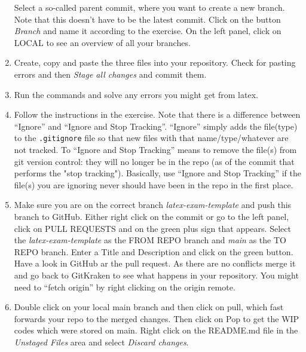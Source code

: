 \begin{enumerate}
Select a so-called parent commit, where you want to create a new branch.
Note that this doesn't have to be the latest commit.
Click on the button \emph{Branch} and name it according to the exercise.
On the left panel, click on LOCAL to see an overview of all your branches.
\item Create, copy and paste the three files into your repository.
Check for pasting errors and then \emph{Stage all changes} and commit them.
\item Run the commands and solve any errors you might get from latex.
\item Follow the instructions in the exercise.
Note that there is a difference between \enquote{Ignore} and \enquote{Ignore and Stop Tracking}.
\enquote{Ignore} simply adds the file(type) to the \texttt{.gitignore} file so that new files with that name/type/whatever are not tracked.
To \enquote{Ignore and Stop Tracking} means to remove the file(s) from git version control:
  they will no longer be in the repo (as of the commit that performs the "stop tracking").
Basically, use \enquote{Ignore and Stop Tracking} if the file(s) you are ignoring never should have been in the repo in the first place.
\item Make sure you are on the correct branch \emph{latex-exam-template}
  and push this branch to GitHub.
Either right click on the commit or go to the left panel, click on PULL REQUESTS and on the green plus sign that appears.
Select the \emph{latex-exam-template} as the FROM REPO branch and \emph{main} as the TO REPO branch.
Enter a Title and Description and click on the green button.
Have a look in GitHub ar the pull request.
As there are no conflicts merge it and go back to GitKraken to see what happens in your repository.
You might need to \enquote{fetch origin} by right clicking on the origin remote.
\item Double click on your local main branch and then click on pull,
  which fast forwards your repo to the merged changes.
  Then click on Pop to get the WIP codes which were stored on main.
  Right click on the README.md file in the \emph{Unstaged Files} area and select \emph{Discard changes}.
\end{enumerate}